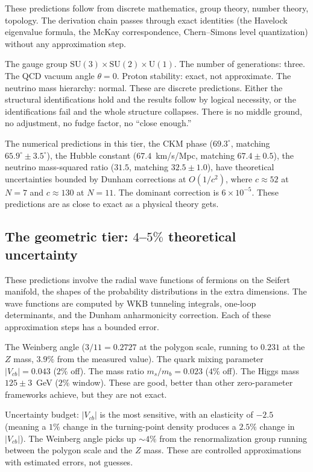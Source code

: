 These predictions follow from discrete mathematics, group theory,
number theory, topology. The derivation chain passes through exact
identities (the Havelock eigenvalue formula, the McKay correspondence,
Chern--Simons level quantization) without any approximation step.

The gauge group $\mathrm{SU}(3) \times \mathrm{SU}(2) \times
\mathrm{U}(1)$. The number of generations: three. The QCD vacuum angle
$\theta = 0$. Proton stability: exact, not approximate. The neutrino
mass hierarchy: normal. These are discrete predictions. Either the
structural identifications hold and the results follow by logical
necessity, or the identifications fail and the whole structure
collapses. There is no middle ground, no adjustment, no fudge factor,
no ``close enough.''

The numerical predictions in this tier, the CKM phase ($69.3^\circ$,
matching $65.9^\circ \pm 3.5^\circ$), the Hubble constant
($67.4$~km/s/Mpc, matching $67.4 \pm 0.5$), the neutrino mass-squared
ratio ($31.5$, matching $32.5 \pm 1.0$), have theoretical uncertainties
bounded by Dunham corrections at $O(1/c^2)$, where $c \approx 52$ at
$N = 7$ and $c \approx 130$ at $N = 11$. The dominant correction is
$6 \times 10^{-5}$. These predictions are as close to exact as a
physical theory gets.

\subsection*{The geometric tier: $4$--$5\%$ theoretical uncertainty}

These predictions involve the radial wave functions of fermions on the
Seifert manifold, the shapes of the probability distributions in the
extra dimensions. The wave functions are computed by WKB tunneling
integrals, one-loop determinants, and the Dunham anharmonicity
correction. Each of these approximation steps has a bounded error.

The Weinberg angle ($3/11 = 0.2727$ at the polygon scale, running to
$0.231$ at the $Z$ mass, $3.9\%$ from the measured value). The quark
mixing parameter $|V_{cb}| = 0.043$ ($2\%$ off). The mass ratio
$m_s/m_b = 0.023$ ($4\%$ off). The Higgs mass $125 \pm 3$~GeV ($2\%$
window). These are good, better than other zero-parameter frameworks
achieve, but they are not exact.

Uncertainty budget: $|V_{cb}|$ is the most sensitive, with an
elasticity of $-2.5$ (meaning a $1\%$ change in the turning-point
density produces a $2.5\%$ change in $|V_{cb}|$). The Weinberg angle
picks up $\sim 4\%$ from the renormalization group running between the
polygon scale and the $Z$ mass. These are controlled approximations with
estimated errors, not guesses.

